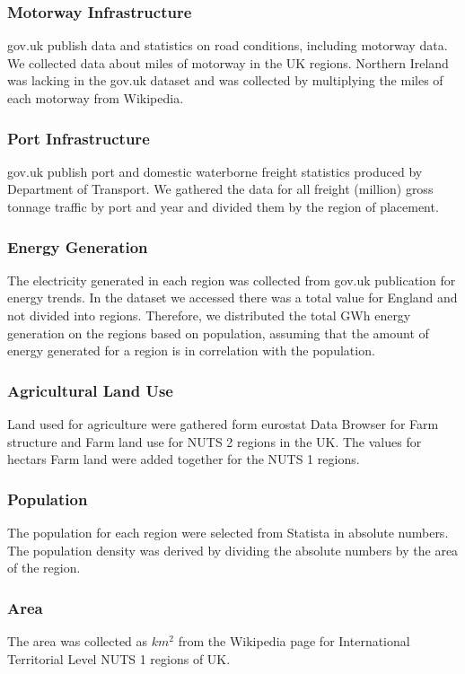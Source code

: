 \documentclass[10pt,a4paper]{article}
\begin{document}
\subsubsection{Motorway Infrastructure}
gov.uk publish data and statistics on road conditions, including motorway data. We collected data about miles of motorway in the UK regions. Northern Ireland was lacking in the gov.uk dataset and was collected by multiplying the miles of each motorway from Wikipedia.
\cite{road,2013category}%
\subsubsection{Port Infrastructure}
gov.uk publish port and domestic waterborne freight statistics produced by Department of Transport. We gathered the data for all freight (million) gross tonnage traffic by port and year and divided them by the region of placement.
\cite{port}
\subsubsection{Energy Generation}
The electricity generated in each region was collected from gov.uk publication for energy trends. In the dataset we accessed there was a total value for England and not divided into regions. Therefore, we distributed the total GWh energy generation on the regions based on population, assuming that the amount of energy generated for a region is in correlation with the population. 
\cite{energy}
\subsubsection{Agricultural Land Use}
Land used for agriculture were gathered form eurostat Data Browser for Farm structure and Farm land use for NUTS 2 regions in the UK. The values for hectars Farm land were added together for the NUTS 1 regions.
\cite{statistics}
\subsubsection{Population}
The population for each region were selected from Statista in absolute numbers. The population density was derived by dividing the absolute numbers by the area of the region. \cite{uk,regional,uk,2022international}
\subsubsection{Area}
The area was collected as $km^2$ from the Wikipedia page for International Territorial Level NUTS 1 regions of UK.
\cite{2022international,regional,uk}
\end{document}
